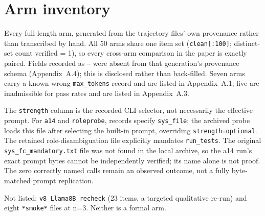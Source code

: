 \section{Arm inventory}
\label{app:arms}

Every full-length arm, generated from the trajectory files' own provenance rather than
transcribed by hand. All 50 arms share one item set (\texttt{clean[:100]}; distinct-set
count verified = 1), so every cross-arm comparison in the paper is exactly paired. Fields
recorded as \texttt{---} were absent from that generation's provenance schema
(Appendix~A.4); this is disclosed rather than back-filled. Seven arms carry a known-wrong
\texttt{max\_tokens} record and are listed in Appendix~A.1; five are inadmissible for pass
rates and are listed in Appendix~A.3.

The \texttt{strength} column is the recorded CLI selector, not necessarily the effective prompt.
For \texttt{a14} and \texttt{roleprobe}, records specify \texttt{sys\_file}; the archived probe
loads this file after selecting the built-in prompt, overriding \texttt{strength=optional}.
The retained role-disambiguation file explicitly mandates \texttt{run\_tests}.
The original \texttt{sys\_fc\_mandatory.txt} file was not found in the local archive, so the
a14 run's exact prompt bytes cannot be independently verified; its name alone is not proof.
The zero correctly named calls remain an observed outcome, not a fully byte-matched prompt replication.

Not listed: \texttt{v8\_Llama8B\_recheck} (23 items, a targeted qualitative re-run) and
eight \texttt{*smoke*} files at n=3. Neither is a formal arm.

